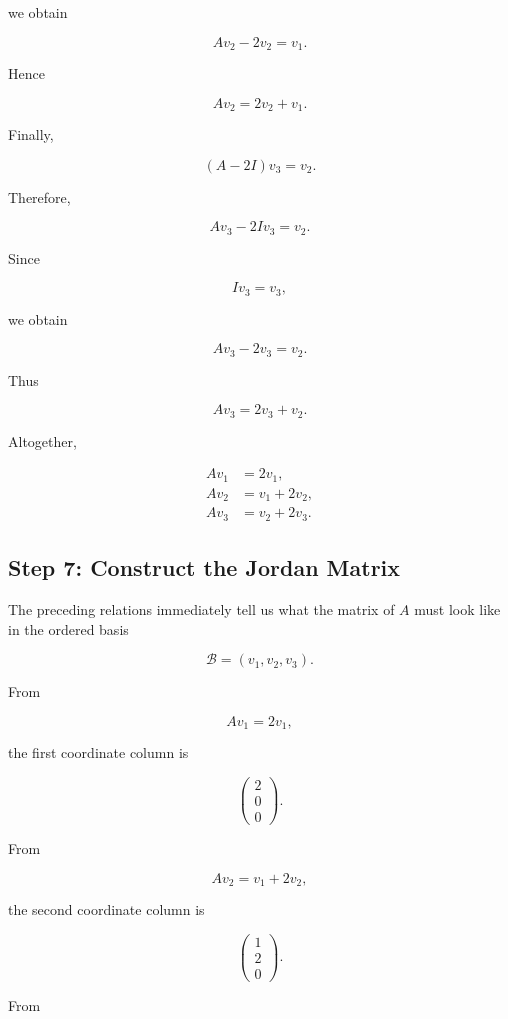 \documentclass[11pt]{article}
\begin{document}
we obtain

\[
Av_2-2v_2=v_1.
\]

Hence

\[
\boxed{
Av_2=2v_2+v_1.
}
\]

Finally,

\[
(A-2I)v_3=v_2.
\]

Therefore,

\[
Av_3-2Iv_3=v_2.
\]

Since

\[
Iv_3=v_3,
\]

we obtain

\[
Av_3-2v_3=v_2.
\]

Thus

\[
\boxed{
Av_3=2v_3+v_2.
}
\]

Altogether,

\[
\boxed{
\begin{aligned}
Av_1&=2v_1,\\
Av_2&=v_1+2v_2,\\
Av_3&=v_2+2v_3.
\end{aligned}
}
\]


\subsection{Step 7: Construct the Jordan Matrix}

The preceding relations immediately tell us what the matrix of \(A\)
must look like in the ordered basis

\[
\mathcal B=(v_1,v_2,v_3).
\]

From

\[
Av_1=2v_1,
\]

the first coordinate column is

\[
\begin{pmatrix}
2\\
0\\
0
\end{pmatrix}.
\]

From

\[
Av_2=v_1+2v_2,
\]

the second coordinate column is

\[
\begin{pmatrix}
1\\
2\\
0
\end{pmatrix}.
\]

From
\end{document}
